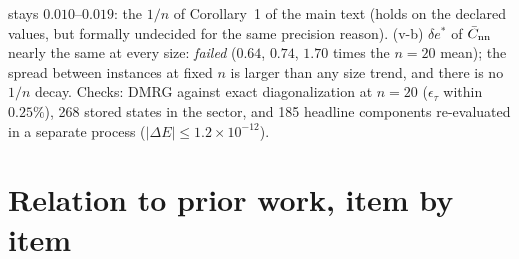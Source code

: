 \documentclass[aps,prx,onecolumn,10pt,nofootinbib,longbibliography,floatfix]{revtex4-2}
\theoremstyle{remark}
\newcommand{\des}{\delta e^{*}}
\begin{document}
stays $0.010$--$0.019$: the $1/n$ of Corollary~1 of the main text (holds on the declared values, but formally undecided for the same %
precision reason). (v-b) $\des$ of $\bar C_{\rm nn}$ nearly the same at every size: \emph{failed} ($0.64$, $0.74$, %
$1.70$ times the $n=20$ mean); the spread between instances at fixed $n$ is larger than any size trend, and there is no %
$1/n$ decay. Checks: DMRG against exact diagonalization at $n=20$ ($\epsilon_\tau$ within $0.25\%$), 268 stored states %
in the sector, and 185 headline components re-evaluated in a separate process ($|\Delta E|\le1.2\times10^{-12}$). %

\section{Relation to prior work, item by item}
\label{sm:prior}
\end{document}
